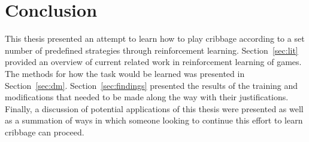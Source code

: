 \section{Conclusion}
\label{sec:conclusion}


This thesis presented an attempt to learn how to play cribbage according
to a set number of predefined strategies through reinforcement learning.
%
Section~\ref{sec:lit} provided an overview of current related work in
reinforcement learning of games.
%
The methods for how the task would be learned was presented in
Section~\ref{sec:dm}.
%
Section~\ref{sec:findings}
presented the results of the training and modifications that needed to be made
along the way with their justifications.
%
Finally,
a discussion of potential applications of this thesis were presented
as well as a summation of ways in which someone looking to continue this effort
to learn cribbage can proceed.

